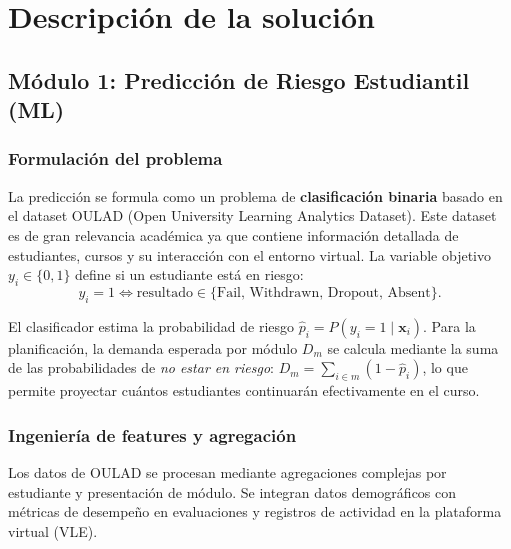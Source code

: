 \documentclass[12pt,twoside]{report}
\theoremstyle{definition}
\begin{document}
\chapter{Descripción de la solución}
\label{ch:solucion}

\section{M\'odulo 1: Predicci\'on de Riesgo Estudiantil (ML)}

\subsection{Formulaci\'on del problema}

La predicci\'on se formula como un problema de \textbf{clasificaci\'on binaria} basado en el dataset OULAD (Open University Learning Analytics Dataset). Este dataset es de gran relevancia acad\'emica ya que contiene informaci\'on detallada de estudiantes, cursos y su interacci\'on con el entorno virtual. La variable objetivo $y_i \in \{0, 1\}$ define si un estudiante est\'a en riesgo:
\begin{equation}
y_i = 1 \iff \text{resultado} \in \{\text{Fail, Withdrawn, Dropout, Absent}\}.
\end{equation}

El clasificador estima la probabilidad de riesgo $\hat{p}_i = P(y_i=1 \mid \mathbf{x}_i)$. Para la planificaci\'on, la demanda esperada por m\'odulo $D_m$ se calcula mediante la suma de las probabilidades de \emph{no estar en riesgo}: $D_m = \sum_{i \in m} (1 - \hat{p}_i)$, lo que permite proyectar cu\'antos estudiantes continuar\'an efectivamente en el curso.

\subsection{Ingenier\'ia de features y agregaci\'on}

Los datos de OULAD se procesan mediante agregaciones complejas por estudiante y presentaci\'on de m\'odulo. Se integran datos demogr\'aficos con m\'etricas de desempe\~no en evaluaciones y registros de actividad en la plataforma virtual (VLE).
\end{document}
